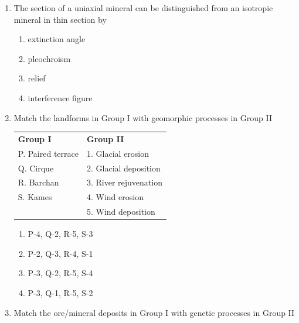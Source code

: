 \documentclass[journal,12pt,onecolumn]{IEEEtran}
\theoremstyle{remark}
\begin{document}
\begin{enumerate}
    \item The  section of a uniaxial mineral can be distinguished from an isotropic mineral in thin section by

    \hfill{}
    
    \begin{multicols}{2}
        \begin{enumerate}
            \item extinction angle
            \item pleochroism
            \item relief
            \item interference figure
        \end{enumerate}
    \end{multicols}

    \item Match the landforms in Group I with geomorphic processes in Group II

    \hfill{}
    
    \begin{tabular}{ll}
        \textbf{Group I} & \textbf{Group II} \\
        P. Paired terrace & 1. Glacial erosion \\
        Q. Cirque & 2. Glacial deposition \\
        R. Barchan & 3. River rejuvenation \\
        S. Kames & 4. Wind erosion \\
        & 5. Wind deposition \\
    \end{tabular}
    
    \begin{multicols}{2}
        \begin{enumerate}
            \item P-4, Q-2, R-5, S-3
            \item P-2, Q-3, R-4, S-1
            \item P-3, Q-2, R-5, S-4
            \item P-3, Q-1, R-5, S-2
        \end{enumerate}
    \end{multicols}

    \item Match the ore/mineral deposits in Group I with genetic processes in Group II

    \hfill{}
    

\end{enumerate}
\end{document}
